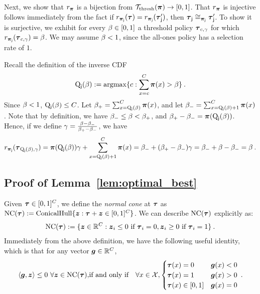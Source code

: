 		Next, we show that $r_{\boldsymbol{\pi}}$ is a bijection from $\mathcal{T}_{\mathrm{thresh}}(\boldsymbol{\pi}) \to [0,1]$. That $r_{\boldsymbol{\pi}}$ is injective follows immediately from the fact if $r_{\boldsymbol{\pi}_{\mathsf{j}}}(\boldsymbol{\tau}) = r_{\boldsymbol{\pi}_{\mathsf{j}}}(\boldsymbol{\tau}_{\mathsf{j}}')$, then $\boldsymbol{\tau}_{\mathsf{j}} \cong_{\boldsymbol{\pi}_{\mathsf{j}}} \boldsymbol{\tau}_{\mathsf{j}}'$. To show it is surjective, we exhibit for every $\beta \in [0,1]$ a threshold policy $\boldsymbol{\tau}_{c,\gamma}$ for which $r_{\boldsymbol{\pi}_{\mathsf{j}}}(\boldsymbol{\tau}_{c,\gamma}) = \beta$. We may assume $\beta < 1$, since the all-ones policy has a selection rate of $1$.

		Recall the definition of the inverse CDF 
		\begin{eqnarray*}
		\RCDFj(\accrate) := \argmax\{c:\sum_{x=c}^C\dist(x) > \accrate\}\:.
		\end{eqnarray*}
		Since $\beta < 1$, $\mathrm{Q}_{\mathsf{j}}(\beta) \le C$. Let $\beta_+ = \sum_{x=\mathrm{Q}_{\mathsf{j}}(\beta)}^C\boldsymbol{\pi}(x)$, and let $\beta_- = \sum_{x=\mathrm{Q}_{\mathsf{j}}(\beta) + 1}^C\boldsymbol{\pi}(x)$. Note that by definition, we have $\beta_- \le \beta < \beta_+$, and $\beta_+ - \beta_- = \boldsymbol{\pi}(\mathrm{Q}_{\mathsf{j}}(\beta))$. Hence, if we define $\gamma = \frac{\beta - \beta_-}{\beta_+ - \beta_-}$, we have 
		\begin{eqnarray*}
		r_{\boldsymbol{\pi}_{\mathsf{j}}}(\boldsymbol{\tau}_{\mathrm{Q}_{\mathsf{j}}(\beta), \gamma}) =  \boldsymbol{\pi}(\mathrm{Q}_{\mathsf{j}}(\beta)) \gamma + \sum_{x=\mathrm{Q}_{\mathsf{j}}(\beta) + 1}^C\boldsymbol{\pi}(x) = \beta_- + (\beta_+ - \beta_-)\gamma = \beta_- + \beta - \beta_- = \beta\:.
		\end{eqnarray*}


\subsection{Proof of Lemma~\ref{lem:optimal_best}~\label{sec:optimal_best_proof}}
	Given $\boldsymbol{\tau} \in [0,1]^{C}$, 
	we define the \emph{normal cone} at $\boldsymbol{\tau}$ as $\mathrm{NC}(\boldsymbol{\tau}):= \mathrm{ConicalHull}\{\boldsymbol{z}: \boldsymbol{\tau} + \boldsymbol{z} \in [0,1]^{C}\}$. 
	We can describe $\mathrm{NC}(\boldsymbol{\tau})$ explicitly as:
	\begin{eqnarray*}\label{eq:normal_cone_def}
	 \mathrm{NC}(\boldsymbol{\tau}) := \{\boldsymbol{z} \in \mathbb{R}^{C} : \boldsymbol{z}_i \le 0 \text{ if } \boldsymbol{\tau}_i = 0, \boldsymbol{z}_i \ge 0 \text{ if } \boldsymbol{\tau}_i = 1\}\:.
	\end{eqnarray*}
	Immediately from the above definition, we have the following useful identity, which is that for any vector $\boldsymbol{g} \in \mathbb{R}^C$,
	\begin{eqnarray}\label{eq:normal_cone_first_order}
	\langle \boldsymbol{g}, \boldsymbol{z} \rangle \le 0 ~\forall \boldsymbol{z} \in \mathrm{NC}(\boldsymbol{\tau}),  &\text{if and only if}& \forall x\in \mathcal{X}, \begin{cases} \boldsymbol{\tau}(x) = 0 & \boldsymbol{g}(x) < 0\\
	\boldsymbol{\tau}(x) = 1 & \boldsymbol{g}(x) > 0\\
	\boldsymbol{\tau}(x) \in [0,1] & \boldsymbol{g}(x) = 0
	\end{cases}\:.
	\end{eqnarray}


